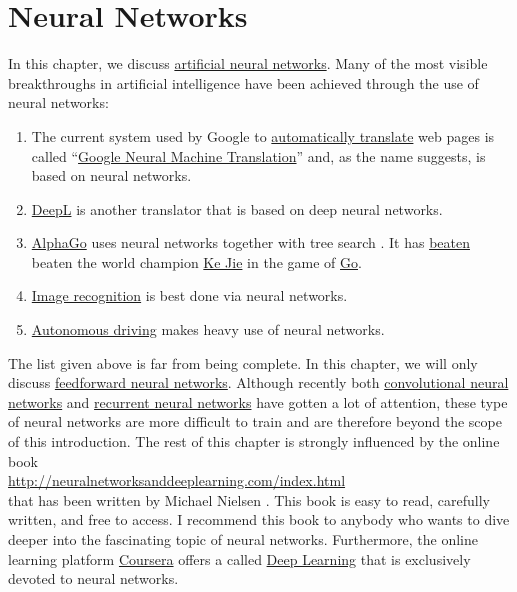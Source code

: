 \chapter{Neural Networks}
In this chapter, we discuss \href{https://en.wikipedia.org/wiki/Artificial_neural_network}{artificial neural networks}.
Many of the most visible breakthroughs in artificial intelligence have been achieved through the use of neural
networks: 
\begin{enumerate}
\item The current system used by Google to \href{https://translate.google.com}{automatically translate} web
      pages is called 
      ``\href{https://en.wikipedia.org/wiki/Google_Neural_Machine_Translation}{Google Neural Machine
        Translation}''
      and,  as the name suggests, is based on neural networks. 
\item \href{https://www.deepl.com/translator}{DeepL} is another translator that is based on deep neural networks.      
\item \href{https://de.wikipedia.org/wiki/AlphaGo}{AlphaGo} uses neural networks together with tree search
      \cite{silver:2016}.  It has \href{https://en.wikipedia.org/wiki/AlphaGo_versus_Ke_Jie}{beaten} 
      beaten the world champion \href{https://en.wikipedia.org/wiki/Ke_Jie}{Ke Jie} in the game of
      \href{https://en.wikipedia.org/wiki/Go_(game)}{Go}.
\item \href{https://www.tensorflow.org/tutorials/image_recognition}{Image recognition} is best done via neural networks.
\item \href{https://en.wikipedia.org/wiki/Autonomous_car}{Autonomous driving} makes heavy use of neural networks.
\end{enumerate}
The list given above is far from being complete.  In this chapter, we will only discuss 
\href{https://en.wikipedia.org/wiki/Feedforward_neural_network}{feedforward neural networks}.  Although recently both 
\href{https://en.wikipedia.org/wiki/Convolutional_neural_network}{convolutional neural networks} and
\href{https://en.wikipedia.org/wiki/Recurrent_neural_network}{recurrent neural networks} have gotten a lot of
attention, these type of neural networks are more difficult to train and are therefore beyond the scope of this
introduction.  The rest of this chapter is strongly influenced by the online book 
\\[0.2cm]
\hspace*{1.3cm}
\href{http://neuralnetworksanddeeplearning.com/index.html}{http://neuralnetworksanddeeplearning.com/index.html}
\\[0.2cm]
that has been written by Michael Nielsen \cite{nielsen:2015}.  This book is easy to read, carefully written, and
free to access.  I recommend this book to anybody who wants to dive deeper into the fascinating topic of neural
networks.  Furthermore, the online learning platform \href{https://www.coursera.org/}{Coursera} offers a
 called \href{https://www.coursera.org/specializations/deep-learning}{Deep Learning} that
is exclusively devoted to neural networks.

